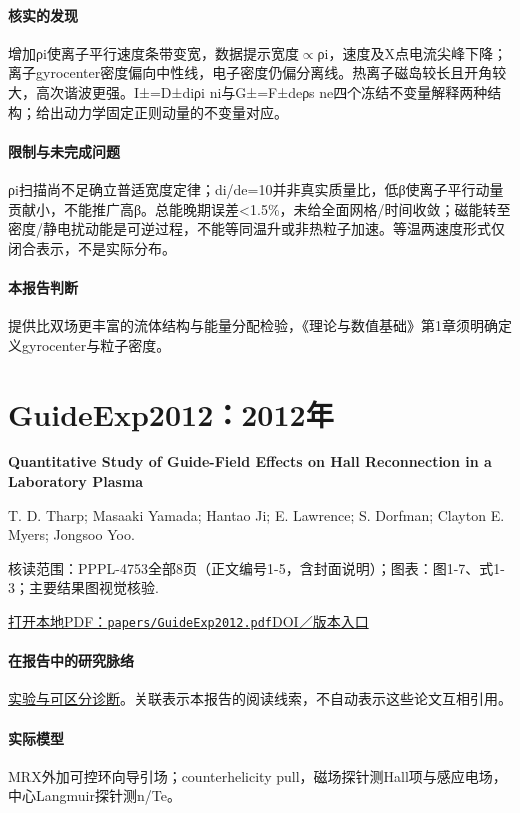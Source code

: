 \documentclass[UTF8,a4paper,11pt,openany,fontset=fandol]{ctexbook}
\begin{document}
\paragraph{核实的发现}增加ρi使离子平行速度条带变宽，数据提示宽度\ensuremath{\propto}ρi，速度及X点电流尖峰下降；离子gyrocenter密度偏向中性线，电子密度仍偏分离线。热离子磁岛较长且开角较大，高次谐波更强。I±=D±diρi ni与G±=F±deρs ne四个冻结不变量解释两种结构；给出动力学固定正则动量的不变量对应。

\paragraph{限制与未完成问题}ρi扫描尚不足确立普适宽度定律；di/de=10并非真实质量比，低β使离子平行动量贡献小，不能推广高β。总能晚期误差<1.5\%，未给全面网格/时间收敛；磁能转至密度/静电扰动能是可逆过程，不能等同温升或非热粒子加速。等温两速度形式仅闭合表示，不是实际分布。

\paragraph{本报告判断}提供比双场更丰富的流体结构与能量分配检验，《理论与数值基础》第1章须明确定义gyrocenter与粒子密度。

\section{GuideExp2012：2012年}\label{paper:GuideExp2012}

\textbf{Quantitative Study of Guide-Field Effects on Hall Reconnection in a Laboratory Plasma}\citep{GuideExp2012}\

T. D. Tharp;  Masaaki Yamada;  Hantao Ji;  E. Lawrence;  S. Dorfman;  Clayton E. Myers;  Jongsoo Yoo.

\textsf{核读范围：}PPPL-4753全部8页（正文编号1-5，含封面说明）；\textsf{图表：}图1-7、式1-3；主要结果图视觉核验.

\href{run:../papers/GuideExp2012.pdf}{打开本地PDF：\texttt{papers/GuideExp2012.pdf}}\quad\href{https://doi.org/10.1103/physrevlett.109.165002}{DOI／版本入口}

\paragraph{在报告中的研究脉络}\hyperref[story:diagnostic]{实验与可区分诊断}。关联表示本报告的阅读线索，不自动表示这些论文互相引用。

\paragraph{实际模型}MRX外加可控环向导引场；counterhelicity pull，磁场探针测Hall项与感应电场，中心Langmuir探针测n/Te。
\end{document}
